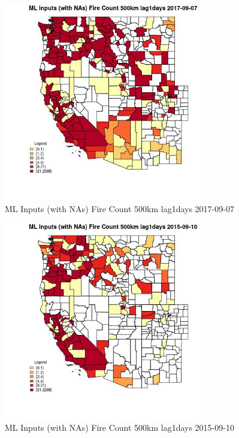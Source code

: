 \begin{figure} 
\centering  
\includegraphics[width=0.77\textwidth]{Code_Outputs/Report_ML_input_PM25_Step4_part_e_de_duplicated_aves_compiled_2019-05-21wNAs_CountyFire_Count_500km_lag1daysMean2017-09-07.jpg} 
\caption{\label{fig:Report_ML_input_PM25_Step4_part_e_de_duplicated_aves_compiled_2019-05-21wNAsCountyFire_Count_500km_lag1daysMean2017-09-07}ML Inputs (with NAs) Fire Count 500km lag1days 2017-09-07} 
\end{figure} 
 

\begin{figure} 
\centering  
\includegraphics[width=0.77\textwidth]{Code_Outputs/Report_ML_input_PM25_Step4_part_e_de_duplicated_aves_compiled_2019-05-21wNAs_CountyFire_Count_500km_lag1daysMean2015-09-10.jpg} 
\caption{\label{fig:Report_ML_input_PM25_Step4_part_e_de_duplicated_aves_compiled_2019-05-21wNAsCountyFire_Count_500km_lag1daysMean2015-09-10}ML Inputs (with NAs) Fire Count 500km lag1days 2015-09-10} 
\end{figure} 
 

